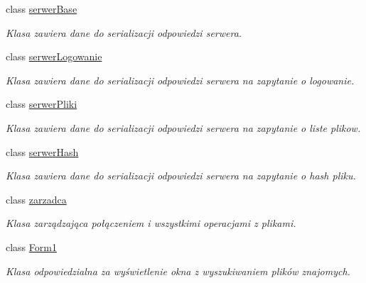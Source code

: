 \begin{CompactItemize}
class \hyperlink{a00023}{serwerBase}
\begin{CompactList}\small\item\em Klasa zawiera dane do serializacji odpowiedzi serwera. \item\end{CompactList}\item 
class \hyperlink{a00025}{serwerLogowanie}
\begin{CompactList}\small\item\em Klasa zawiera dane do serializacji odpowiedzi serwera na zapytanie o logowanie. \item\end{CompactList}\item 
class \hyperlink{a00026}{serwerPliki}
\begin{CompactList}\small\item\em Klasa zawiera dane do serializacji odpowiedzi serwera na zapytanie o liste plikow. \item\end{CompactList}\item 
class \hyperlink{a00024}{serwerHash}
\begin{CompactList}\small\item\em Klasa zawiera dane do serializacji odpowiedzi serwera na zapytanie o hash pliku. \item\end{CompactList}\item 
class \hyperlink{a00037}{zarzadca}
\begin{CompactList}\small\item\em Klasa zarządzająca połączeniem i wszystkimi operacjami z plikami. \item\end{CompactList}\item 
class \hyperlink{a00003}{Form1}
\begin{CompactList}\small\item\em Klasa odpowiedzialna za wyświetlenie okna z wyszukiwaniem plików znajomych. \item\end{CompactList}\end{CompactItemize}
